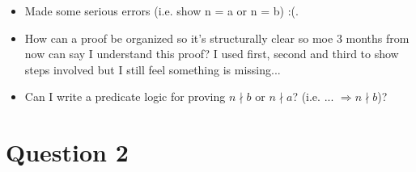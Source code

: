 \documentclass[12pt]{article}
\begin{document}
\begin{enumerate}[a.]
    \begin{itemize}
        \item Made some serious errors (i.e. show n = a or n = b) :(.
        \item How can a proof be organized so it's structurally clear so moe
        3 months from now can say I understand this proof? I used first, second
        and third to show steps involved but I still feel something is missing...
        \item Can I write a predicate logic for proving $n \nmid b$ or $n \nmid a$?
        (i.e. ... $\Rightarrow n \nmid b$)?
    \end{itemize}


\end{enumerate}

\section*{Question 2}
\end{document}
